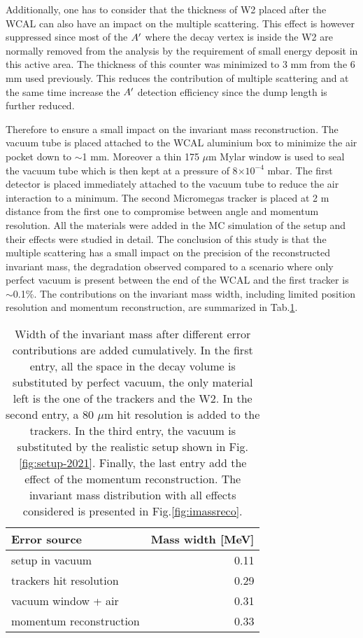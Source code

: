 Additionally, one has to consider that the thickness of W2 placed after the WCAL can also have an impact on the multiple scattering. This effect is however suppressed since most of the $A'$ where the decay vertex is inside the W2 are normally removed from the analysis by the requirement of small energy deposit in this active area. The thickness of this counter was minimized to 3 mm from the 6 mm used previously. This reduces the contribution of multiple scattering and at the same time increase the $A'$ detection efficiency since the dump length is further reduced.

Therefore to ensure a small impact on the invariant mass reconstruction. The vacuum tube is placed attached to the WCAL aluminium box to minimize the air pocket down to $\sim$1 mm. Moreover a thin 175 $\mu$m Mylar window is used to seal the vacuum tube which is then kept at a pressure of 8$\times 10^{-4}$ mbar. The first detector is placed immediately attached to the vacuum tube to reduce the air interaction to a minimum. The second Micromegas tracker is placed at 2 m distance from the first one to compromise between angle and momentum resolution. All the materials were added in the MC simulation of the setup and their effects were studied in detail. The conclusion of this study is that the multiple scattering has a small impact on the precision of the reconstructed invariant mass, the degradation observed compared to a scenario where only perfect vacuum is present between the end of the WCAL and the first tracker is $\sim$0.1\%. The contributions on the invariant mass width, including limited position resolution and momentum reconstruction, are summarized in Tab.\ref{tab:imass-width}.

\begin{center}
  \begin{table}[bth!]
    \centering
    \begin{tabular}{|l|r|}
      \hline
      Error source & Mass width [MeV]\\
      \hline
      setup in vacuum & 0.11\\
      trackers hit resolution & 0.29\\
      vacuum window + air & 0.31\\
      momentum reconstruction & 0.33\\
      \hline
    \end{tabular}
    \label{tab:imass-width}
    \caption[Error budget for the invariant mass in 2021 setup]{Width of the invariant mass after different error contributions are added cumulatively. In the first entry, all the space in the decay volume is substituted by perfect vacuum, the only material left is the one of the trackers and the W2. In the second entry, a 80 $\mu$m hit resolution is added to the trackers. In the third entry, the vacuum is substituted by the realistic setup shown in Fig.\ref{fig:setup-2021}. Finally, the last entry add the effect of the momentum reconstruction. The invariant mass distribution with all effects considered is presented in Fig.\ref{fig:imassreco}.}
  \end{table}
\end{center}

